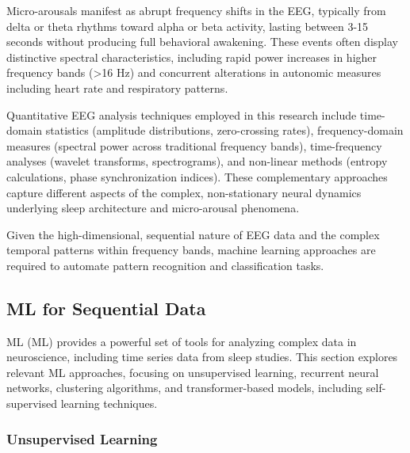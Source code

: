 \documentclass[a4paper,12pt,twoside]{article}
\begin{document}
Micro-arousals manifest as abrupt frequency shifts in the EEG, typically from delta or theta rhythms toward alpha or beta activity, lasting between 3-15 seconds without producing full behavioral awakening. These events often display distinctive spectral characteristics, including rapid power increases in higher frequency bands (>16 Hz) and concurrent alterations in autonomic measures including heart rate and respiratory patterns.

Quantitative EEG analysis techniques employed in this research include time-domain statistics (amplitude distributions, zero-crossing rates), frequency-domain measures (spectral power across traditional frequency bands), time-frequency analyses (wavelet transforms, spectrograms), and non-linear methods (entropy calculations, phase synchronization indices). These complementary approaches capture different aspects of the complex, non-stationary neural dynamics underlying sleep architecture and micro-arousal phenomena.

Given the high-dimensional, sequential nature of EEG data and the complex temporal patterns within frequency bands, machine learning approaches are required to automate pattern recognition and classification tasks.

\subsection{ML for Sequential Data}  %
ML (ML) provides a powerful set of tools for analyzing complex data in neuroscience, including time series data from sleep studies. This section explores relevant ML approaches, focusing on unsupervised learning, recurrent neural networks, clustering algorithms, and transformer-based models, including self-supervised learning techniques.

\subsubsection{Unsupervised Learning}
    
\end{document}
